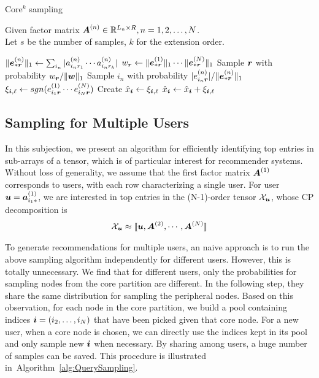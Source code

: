\documentclass[letterpaper]{article}
\newcommand{\Sca}[3]{{#1}^{(#2)}_{i_#2#3}}%
\newcommand{\anr}[2]{\Sca{a}{#1}{#2}}
\newcommand{\enr}[2]{\Sca{e}{#1}{\V{#2}}}
\newcommand{\score}[1]{\xi_{\V{i},#1}}
\newcommand{\T}[1]{\mathcal{#1}}
\newcommand{\KT}[1]{\llbracket #1 \rrbracket}
\newcommand{\V}[1]{{\boldsymbol{{\MakeLowercase{#1}}}}}
\newcommand{\ColVec}[3]{\V{#1}^{(#2)}_{#3}}
\newcommand{\NormColE}[2]{\norm{\ColVec{e}{#1}{*\V{#2}}}{1}}
\newcommand{\RowVecA}[1]{\V{a}^{(#1)}_{i_#1*}}
\newcommand{\coord}{(i_1,i_2,\ldots,i_N)}
\newcommand{\predx}{\hat{x}_{\V{i}}}
\newcommand{\M}[1]{{\boldsymbol{{\MakeUppercase{#1}}}}}
\newcommand{\FacMat}[2]{\M{#1}^{(#2)}}
\newcommand{\norm}[2]{\|#1\|_{#2}}
\newcommand{\Alg}[1]{Algorithm~\ref{alg:#1}}
\begin{document}
\begin{algorithm}[!ht]
    \caption{Core$^k$ sampling}
    \label{alg:CoreExtensionSampling}
    Given factor matrix $\FacMat{A}{n}\in \mathbb{R}^{L_n\times R}, n = 1,2,\ldots,N$.\\
    Let $s$ be the number of samples, $k$ for the extension order.
    \begin{algorithmic}[1]
    \For{$\V{r}\in{\underbrace{R\times \cdots \times R}_{k}}$}
    \State $\NormColE{n}{r} \leftarrow \sum_{i_n}|\anr{n}{r_1}\cdots\anr{n}{r_k}|$
    \EndFor
    \State $w_{\V{r}} \leftarrow \NormColE{1}{r} \cdots \NormColE{N}{r} $
    \EndFor
    \State Sample $\V{r}$ with probability $w_\V{r}/\norm{\V{W}}{1}$
    \label{line:nodes}
    \State Sample $i_n$ with probability $|\enr{n}{r}|/\NormColE{n}{r}$
    \EndFor
    \State
        $\score{\ell} \leftarrow sgn(\enr{1}{r}\cdots\enr{N}{r})$
    \If {$\V{i}=\coord$ has not been sampled}
    \State  Create $\predx \leftarrow \score{\ell} $
    \Else
    \State $\predx \leftarrow \predx + \score{\ell}$
    \EndIf
    \EndFor
    \end{algorithmic}
\end{algorithm}

\subsection{Sampling for Multiple Users}
In this subjection,
we present an algorithm for efficiently identifying top entries in sub-arrays of a tensor,
which is of particular interest for recommender systems.
Without loss of generality,
we assume that the first factor matrix $\FacMat{A}{1}$ corresponds to users,
with each row characterizing a single user.
For user $\V{u} = \RowVecA{1}$,
we are interested in top entries in the (N-1)-order tensor $\T{X}_\V{u}$,
whose CP decomposition is
\begin{align}
    \T{X}_{\V{u}} \approx \KT{\V{u},\FacMat{A}{2},\cdots,\FacMat{A}{N}}
\end{align}

To generate recommendations for multiple users,
an naive approach is to run the above sampling algorithm independently for different users.
However, this is totally unnecessary.
We find that for different users,
only the probabilities for sampling nodes from the core partition are different.
In the following step, they share the same distribution for sampling the peripheral nodes.
Based on this observation, for each node in the core partition,
we build a pool containing indices $\V{i}=(i_2,\ldots,i_N)$ that have been picked given that core node.
For a new user, when a core node is chosen,
we can directly use the indices kept in its pool and only sample new $\V{i}$ when necessary.
By sharing among users, a huge number of samples can be saved.
This procedure is illustrated in~\Alg{QuerySampling}.
\end{document}
